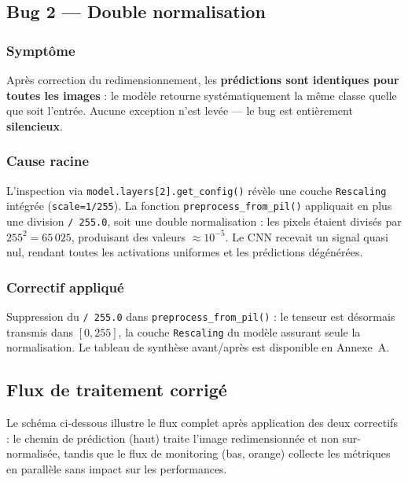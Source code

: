 \documentclass[french, a4paper, 12pt]{article}
\begin{document}
\subsection{Bug 2 --- Double normalisation}

\subsubsection*{Symptôme}

Après correction du redimensionnement, les \textbf{prédictions sont identiques pour toutes
les images} : le modèle retourne systématiquement la même classe quelle que soit l'entrée.
Aucune exception n'est levée — le bug est entièrement \textbf{silencieux}.

\subsubsection*{Cause racine}

L'inspection via \texttt{model.layers[2].get\_config()} révèle une couche \texttt{Rescaling}
intégrée (\texttt{scale=1/255}). La fonction \texttt{preprocess\_from\_pil()} appliquait en
plus une division \texttt{/ 255.0}, soit une double normalisation : les pixels étaient divisés
par $255^2 = 65\,025$, produisant des valeurs $\approx 10^{-5}$. Le CNN recevait un signal
quasi nul, rendant toutes les activations uniformes et les prédictions dégénérées.

\subsubsection*{Correctif appliqué}

Suppression du \texttt{/ 255.0} dans \texttt{preprocess\_from\_pil()} : le tenseur est
désormais transmis dans $[0, 255]$, la couche \texttt{Rescaling} du modèle assurant seule
la normalisation. Le tableau de synthèse avant/après est disponible en Annexe~A.

\subsection{Flux de traitement corrigé}

Le schéma ci-dessous illustre le flux complet après application des deux correctifs :
le chemin de prédiction (haut) traite l'image redimensionnée et non sur-normalisée,
tandis que le flux de monitoring (bas, orange) collecte les métriques en parallèle
sans impact sur les performances.
\end{document}
